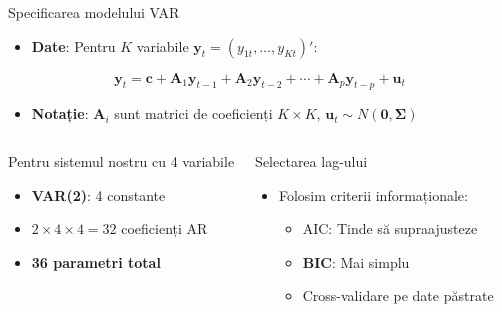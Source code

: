 \documentclass[9pt, aspectratio=169, t]{beamer}
\begin{document}
\begin{frame}{Specificarea modelului VAR}
    \begin{defn}
        \begin{itemize}\setlength{\itemsep}{0pt}
            \item \textbf{Date}: Pentru $K$ variabile $\mathbf{y}_t = (y_{1t}, \ldots, y_{Kt})'$:
        \end{itemize}
        \vspace{-0.2cm}
        \begin{equation*}
            \mathbf{y}_t = \mathbf{c} + \mathbf{A}_1\mathbf{y}_{t-1} + \mathbf{A}_2\mathbf{y}_{t-2} + \cdots + \mathbf{A}_p\mathbf{y}_{t-p} + \mathbf{u}_t
        \end{equation*}
        \vspace{-0.3cm}
        \begin{itemize}\setlength{\itemsep}{0pt}
            \item \textbf{Notație}: $\mathbf{A}_i$ sunt matrici de coeficienți $K \times K$, $\mathbf{u}_t \sim N(\mathbf{0}, \boldsymbol{\Sigma})$
        \end{itemize}
    \end{defn}

    \vspace{0.1cm}

    \begin{columns}[T]
        \begin{block}{Pentru sistemul nostru cu 4 variabile}
            \begin{itemize}\setlength{\itemsep}{0pt}
                \item \textbf{VAR(2)}: 4 constante
                \item $2 \times 4 \times 4 = 32$ coeficienți AR
                \item \textbf{36 parametri total}
            \end{itemize}
        \end{block}

        \begin{exampleblock}{Selectarea lag-ului}
            \begin{itemize}\setlength{\itemsep}{0pt}
                \item Folosim criterii informaționale:
                \begin{itemize}
                    \item AIC: Tinde să supraajusteze
                    \item \textbf{BIC}: Mai simplu
                    \item Cross-validare pe date păstrate
                \end{itemize}
            \end{itemize}
        \end{exampleblock}
    \end{columns}
\end{frame}
\end{document}

